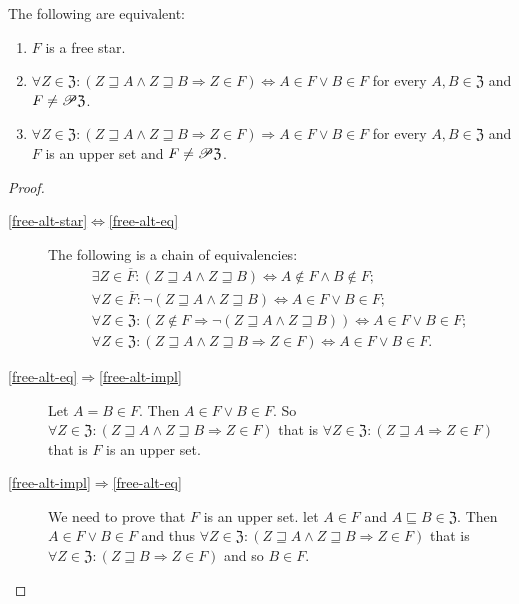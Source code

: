 \begin{prop}
The following are equivalent:
\begin{enumerate}
\item \label{free-alt-star}$F$ is a free star.
\item \label{free-alt-eq}$\forall Z\in\mathfrak{Z}:(Z\sqsupseteq A\wedge Z\sqsupseteq B\Rightarrow Z\in F)\Leftrightarrow A\in F\vee B\in F$
for every $A,B\in\mathfrak{Z}$ and $F\neq\mathscr{P}\mathfrak{Z}$.
\item \label{free-alt-impl}$\forall Z\in\mathfrak{Z}:(Z\sqsupseteq A\wedge Z\sqsupseteq B\Rightarrow Z\in F)\Rightarrow A\in F\vee B\in F$
for every $A,B\in\mathfrak{Z}$ and $F$ is an upper set and $F\neq\mathscr{P}\mathfrak{Z}$.
\end{enumerate}
\end{prop}
\begin{proof}
~
\begin{description}
\item [{\ref{free-alt-star}$\Leftrightarrow$\ref{free-alt-eq}}] The following
is a chain of equivalencies: 
\begin{gather*}
\exists Z\in\overline{F}:(Z\sqsupseteq A\wedge Z\sqsupseteq B)\Leftrightarrow A\notin F\wedge B\notin F;\\
\forall Z\in\overline{F}:\neg(Z\sqsupseteq A\wedge Z\sqsupseteq B)\Leftrightarrow A\in F\vee B\in F;\\
\forall Z\in\mathfrak{Z}:(Z\notin F\Rightarrow\neg(Z\sqsupseteq A\wedge Z\sqsupseteq B))\Leftrightarrow A\in F\vee B\in F;\\
\forall Z\in\mathfrak{Z}:(Z\sqsupseteq A\wedge Z\sqsupseteq B\Rightarrow Z\in F)\Leftrightarrow A\in F\vee B\in F.
\end{gather*}

\item [{\ref{free-alt-eq}$\Rightarrow$\ref{free-alt-impl}}]
Let $A=B\in F$. Then $A\in F\lor B\in F$. So $\forall Z\in\mathfrak{Z}:(Z\sqsupseteq A\wedge Z\sqsupseteq B\Rightarrow Z\in F)$
that is $\forall Z\in\mathfrak{Z}:(Z\sqsupseteq A\Rightarrow Z\in F)$ that is $F$ is an upper set.

\item [{\ref{free-alt-impl}$\Rightarrow$\ref{free-alt-eq}}] We need
to prove that $F$ is an upper set. let $A\in F$ and $A\sqsubseteq B\in\mathfrak{Z}$.
Then $A\in F\lor B\in F$ and thus $\forall Z\in\mathfrak{Z}:(Z\sqsupseteq A\wedge Z\sqsupseteq B\Rightarrow Z\in F)$
that is $\forall Z\in\mathfrak{Z}:(Z\sqsupseteq B\Rightarrow Z\in F)$
and so $B\in F$.
\end{description}
\end{proof}
